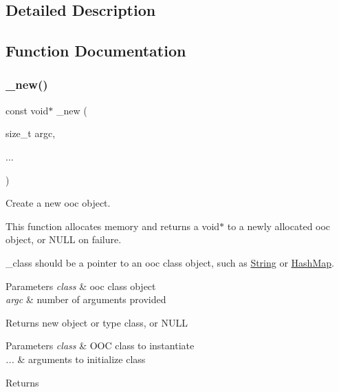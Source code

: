 \subsection{Detailed Description}


\subsection{Function Documentation}
\mbox{\label{group__common_ga1c393167a5a06a566a2cc64133c1695f}} 
\subsubsection{\texorpdfstring{\+\_\+new()}{\_new()}}
{\footnotesize\ttfamily const void$\ast$ \+\_\+new (\begin{DoxyParamCaption}\item[{size\+\_\+t}]{argc,  }\item[{}]{... }\end{DoxyParamCaption})}



Create a new ooc object. 

This function allocates memory and returns a void$\ast$ to a newly allocated ooc object, or N\+U\+LL on failure.

\+\_\+class should be a pointer to an ooc class object, such as \mbox{\hyperlink{structString}{String}} or \mbox{\hyperlink{structHashMap}{Hash\+Map}}. 
\begin{DoxyParams}{Parameters}
{\em class} & ooc class object \\
\hline
{\em argc} & number of arguments provided \\
\hline
\end{DoxyParams}
\begin{DoxyReturn}{Returns}
new object or type class, or N\+U\+LL
\end{DoxyReturn}

\begin{DoxyParams}{Parameters}
{\em class} & O\+OC class to instantiate \\
\hline
{\em ...} & arguments to initialize class \\
\hline
\end{DoxyParams}
\begin{DoxyReturn}{Returns}

\end{DoxyReturn}


